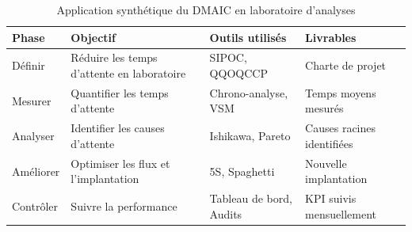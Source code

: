 \documentclass[a4paper,12pt]{article}
\begin{document}
\begin{table}[h!]
\centering
\begin{tabular}{|p{2cm}|p{4cm}|p{4.5cm}|p{3cm}|}
\hline
\textbf{Phase} & \textbf{Objectif} & \textbf{Outils utilisés} & \textbf{Livrables} \\
\hline
Définir & Réduire les temps d'attente en laboratoire & SIPOC, QQOQCCP & Charte de projet \\
\hline
Mesurer & Quantifier les temps d'attente & Chrono-analyse, VSM & Temps moyens mesurés \\
\hline
Analyser & Identifier les causes d'attente & Ishikawa, Pareto & Causes racines identifiées \\
\hline
Améliorer & Optimiser les flux et l'implantation & 5S, Spaghetti & Nouvelle implantation \\
\hline
Contrôler & Suivre la performance & Tableau de bord, Audits & KPI suivis mensuellement \\
\hline
\end{tabular}
\caption{Application synthétique du DMAIC en laboratoire d'analyses}
\label{tab:dmaic_labo}
\end{table}

\begin{center}
\end{center}

\vspace{0.5cm}
\begin{center}
\end{center}
\end{document}
